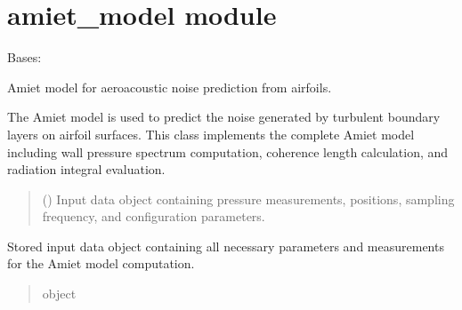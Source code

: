 \documentclass[letterpaper,10pt,english]{sphinxmanual}
\begin{document}
\section{amiet\_model module}
\label{\detokenize{amiet_model:module-amiet_self_noise.amiet_model}}\label{\detokenize{amiet_model:amiet-model-module}}\label{\detokenize{amiet_model::doc}}

\begin{fulllineitems}
\label{\detokenize{amiet_model:amiet_self_noise.amiet_model.AmietModel}}
\pysigstartsignatures
\pysiglinewithargsret
{}
{}
{}
\pysigstopsignatures
\sphinxAtStartPar
Bases: 

\sphinxAtStartPar
Amiet model for aeroacoustic noise prediction from airfoils.

\sphinxAtStartPar
The Amiet model is used to predict the noise generated by turbulent
boundary layers on airfoil surfaces. This class implements the complete
Amiet model including wall pressure spectrum computation, coherence
length calculation, and radiation integral evaluation.
\begin{quote}\begin{description}
\sphinxAtStartPar
{} () \textendash{} Input data object containing pressure measurements, positions,
sampling frequency, and configuration parameters.

\end{description}\end{quote}

\begin{fulllineitems}
\label{\detokenize{amiet_model:amiet_self_noise.amiet_model.AmietModel.input_data}}
\pysigstartsignatures
\pysigline
{}
\pysigstopsignatures
\sphinxAtStartPar
Stored input data object containing all necessary parameters
and measurements for the Amiet model computation.
\begin{quote}\begin{description}
\sphinxAtStartPar
object


\end{description}
\end{quote}
\end{fulllineitems}
\end{fulllineitems}
\end{document}
